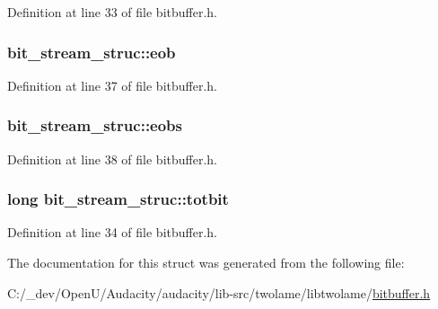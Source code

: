 Definition at line 33 of file bitbuffer.\+h.

\subsubsection[{\texorpdfstring{eob}{eob}}]{ bit\+\_\+stream\+\_\+struc\+::eob}\hypertarget{structbit__stream__struc_af93e9848b03317dcb18f9694b44b90ca}{}\label{structbit__stream__struc_af93e9848b03317dcb18f9694b44b90ca}


Definition at line 37 of file bitbuffer.\+h.

\subsubsection[{\texorpdfstring{eobs}{eobs}}]{ bit\+\_\+stream\+\_\+struc\+::eobs}\hypertarget{structbit__stream__struc_a432bb903be1b63d58d0541a212098af5}{}\label{structbit__stream__struc_a432bb903be1b63d58d0541a212098af5}


Definition at line 38 of file bitbuffer.\+h.

\subsubsection[{\texorpdfstring{totbit}{totbit}}]{\setlength{\rightskip}{0pt plus 5cm}long bit\+\_\+stream\+\_\+struc\+::totbit}\hypertarget{structbit__stream__struc_a0f1aba65586563150618183b07d75af1}{}\label{structbit__stream__struc_a0f1aba65586563150618183b07d75af1}


Definition at line 34 of file bitbuffer.\+h.



The documentation for this struct was generated from the following file\+:\begin{DoxyCompactItemize}
\item 
C\+:/\+\_\+dev/\+Open\+U/\+Audacity/audacity/lib-\/src/twolame/libtwolame/\hyperlink{bitbuffer_8h}{bitbuffer.\+h}\end{DoxyCompactItemize}
